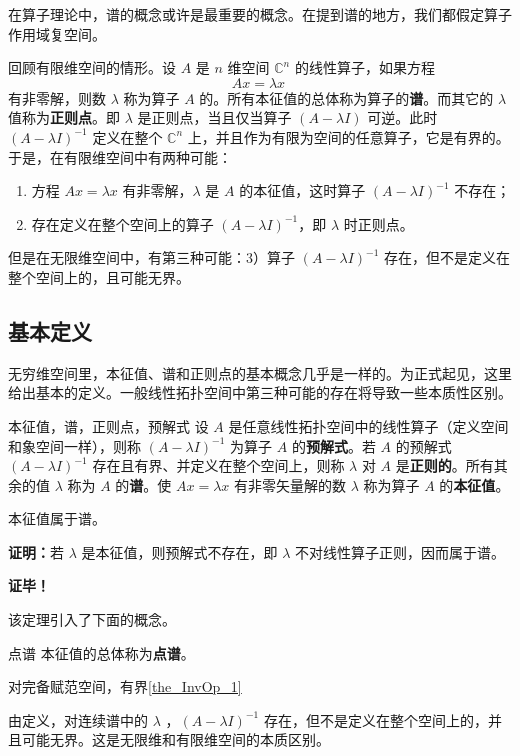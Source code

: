 
\cite{Ke1}在算子理论中，谱的概念或许是最重要的概念。在提到谱的地方，我们都假定算子作用域复空间。

回顾有限维空间的情形。设 $A$ 是 $n$ 维空间 $\mathbb C^n$ 的线性算子，如果方程
\begin{equation}
Ax=\lambda x~
\end{equation}
有非零解，则数 $\lambda$ 称为算子 $A$ 的。所有本征值的总体称为算子的\textbf{谱}。而其它的 $\lambda$ 值称为\textbf{正则点}。即 $\lambda$ 是正则点，当且仅当算子 $(A-\lambda I)$ 可逆。此时 $(A-\lambda I)^{-1}$ 定义在整个 $\mathbb C^n$ 上，并且作为有限为空间的任意算子，它是有界的。于是，在有限维空间中有两种可能：
\begin{enumerate}
\item 方程 $Ax=\lambda x$ 有非零解，$\lambda$ 是 $A$ 的本征值，这时算子 $(A-\lambda I)^{-1}$ 不存在；
\item 存在定义在整个空间上的算子 $(A-\lambda I)^{-1}$，即 $\lambda$ 时正则点。
\end{enumerate}

但是在无限维空间中，有第三种可能：3）算子 $(A-\lambda I)^{-1}$ 存在，但不是定义在整个空间上的，且可能无界。
\subsection{基本定义}
无穷维空间里，本征值、谱和正则点的基本概念几乎是一样的。为正式起见，这里给出基本的定义。一般线性拓扑空间中第三种可能的存在将导致一些本质性区别。
\begin{definition}{本征值，谱，正则点，预解式}
设 $A$ 是任意线性拓扑空间中的线性算子（定义空间和象空间一样），则称 $(A-\lambda I)^{-1}$ 为算子 $A$ 的\textbf{预解式}。若 $A$ 的预解式 $(A-\lambda I)^{-1}$ 存在且有界、并定义在整个空间上，则称 $\lambda$ 对 $A$ 是\textbf{正则的}。所有其余的值 $\lambda$ 称为 $A$ 的\textbf{谱}。使 $Ax=\lambda x$ 有非零矢量解的数 $\lambda$ 称为算子 $A$ 的\textbf{本征值}。
\end{definition}

\begin{theorem}{}
本征值属于谱。
\end{theorem}

\textbf{证明：}若 $\lambda$ 是本征值，则预解式不存在，即 $\lambda$ 不对线性算子正则，因而属于谱。

\textbf{证毕！}

该定理引入了下面的概念。
\begin{definition}{点谱}
本征值的总体称为\textbf{点谱}。
\end{definition}

对完备赋范空间，有界\autoref{the_InvOp_1}


由定义，对连续谱中的 $\lambda$ ，$(A-\lambda I)^{-1}$ 存在，但不是定义在整个空间上的，并且可能无界。这是无限维和有限维空间的本质区别。

